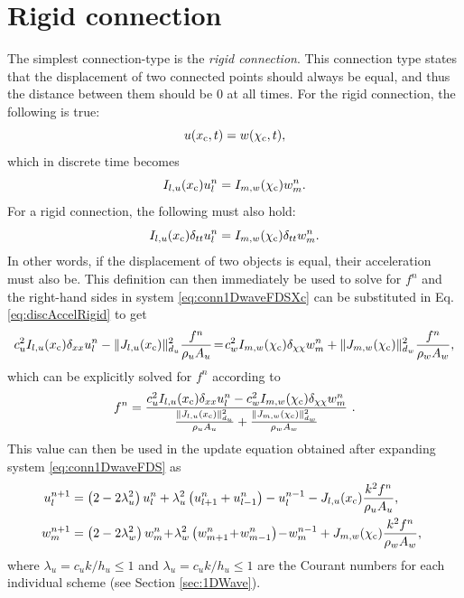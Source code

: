 \section{Rigid connection}\label{sec:rigidConn}
The simplest connection-type is the \textit{rigid connection}. This connection type states that the displacement of two connected points should always be equal, and thus the distance between them should be 0 at all times. 
For the rigid connection, the following is true:
\begin{equation}\label{eq:contRigid}
    u(x_{\text{c}}, t) = w(\chi_{\text{c}}, t),
\end{equation}
which in discrete time becomes
\begin{equation}\label{eq:discRigid}
    I_{l, u}(x_{\text{c}})u_l^n = I_{m, w}(\chi_{\text{c}})w_m^n.
\end{equation}
For a rigid connection, the following must also hold:
\begin{equation}\label{eq:discAccelRigid}
    I_{l, u}(x_{\text{c}})\delta_{tt}u_l^n = I_{m, w}(\chi_{\text{c}})\delta_{tt}w_m^n.
\end{equation}
In other words, if the displacement of two objects is equal, their acceleration must also be. This definition can then immediately be used to solve for $f^n$ and the right-hand sides in system \eqref{eq:conn1DwaveFDSXc} can be substituted in Eq. \eqref{eq:discAccelRigid} to get
\begin{equation*}
    c_u^2 I_{l, u}(x_{\text{c}})\delta_{xx} u_l^n -\lVert J_{l, u}(x_{\text{c}})\rVert_{d_u}^2\frac{f^n}{\rho_u A_u}
    \!=\! c_w^2 I_{m, w}(\chi_{\text{c}})\delta_{\chi\chi} w_m^n + \lVert J_{m, w}(\chi_{\text{c}})\rVert_{d_w}^2\frac{f^n}{\rho_w A_w},
\end{equation*}
which can be explicitly solved for $f^n$ according to
\begin{equation}\label{eq:rigidForce}
    f^n = \frac{c_u^2 I_{l, u}(x_{\text{c}})\delta_{xx} u_l^n - c_w^2 I_{m, w}(\chi_{\text{c}})\delta_{\chi\chi} w_m^n}{\frac{\lVert J_{l, u}(x_{\text{c}})\rVert_{d_u}^2}{\rho_u A_u} + \frac{\lVert J_{m, w}(\chi_{\text{c}})\rVert_{d_w}^2}{\rho_w A_w}}\ .
\end{equation}
This value can then be used in the update equation obtained after expanding system \eqref{eq:conn1DwaveFDS} as
\begin{subequations}
    \begin{align}
        \!\!\!u_l^{n+1} &= \left(2-2\lambda_u^2\right) \uln  + \lambda_u^2\left(u_{l+1}^n + u_{l-1}^n\right) - u_l^{n-1} -\Ju\frac{k^2 f^n}{\rho_u A_u},\\
        \!\!\!w_m^{n+1} &= \left(2-2\lambda_w^2\right) \wmn\! +\! \lambda_w^2\left(w_{m+1}^n\! +\! w_{m-1}^n\right) \! -\! w_m^{n-1} +\Jw\frac{k^2 f^n}{\rho_w A_w},
    \end{align}
\end{subequations}
where $\lambda_u = c_uk/h_u \leq 1$ and  $\lambda_u = c_uk/h_u \leq 1$ are the Courant numbers for each individual scheme (see Section \ref{sec:1DWave}).

